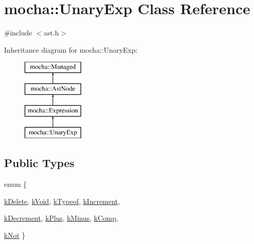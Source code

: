 \hypertarget{classmocha_1_1_unary_exp}{
\section{mocha::UnaryExp Class Reference}
\label{classmocha_1_1_unary_exp}
}


{\ttfamily \#include $<$ast.h$>$}

Inheritance diagram for mocha::UnaryExp:\begin{figure}[H]
\begin{center}
\leavevmode
\includegraphics[height=4.000000cm]{classmocha_1_1_unary_exp}
\end{center}
\end{figure}
\subsection*{Public Types}
\begin{DoxyCompactItemize}
\item 
enum \{ \par
\hyperlink{classmocha_1_1_unary_exp_a621ac6867fcae6e66ea6111eff70cdb0aad8769c251bddb983fcece5ec0cb75f3}{kDelete}, 
\hyperlink{classmocha_1_1_unary_exp_a621ac6867fcae6e66ea6111eff70cdb0a63356cfc69289a4b478e9431802e536a}{kVoid}, 
\hyperlink{classmocha_1_1_unary_exp_a621ac6867fcae6e66ea6111eff70cdb0ac39acc1174b405d0effb5cedcd845364}{kTypeof}, 
\hyperlink{classmocha_1_1_unary_exp_a621ac6867fcae6e66ea6111eff70cdb0af4edf9416048533e31de4e84eefd35f1}{kIncrement}, 
\par
\hyperlink{classmocha_1_1_unary_exp_a621ac6867fcae6e66ea6111eff70cdb0a2cbe8e7f32d47d7d6deea4c8f14e6330}{kDecrement}, 
\hyperlink{classmocha_1_1_unary_exp_a621ac6867fcae6e66ea6111eff70cdb0ace184c36a28e008d10b5471551da2790}{kPlus}, 
\hyperlink{classmocha_1_1_unary_exp_a621ac6867fcae6e66ea6111eff70cdb0a4d6a5e24917c2b1e4f1975d5ba51f7a0}{kMinus}, 
\hyperlink{classmocha_1_1_unary_exp_a621ac6867fcae6e66ea6111eff70cdb0ade84e553b09732430de6b9b0f081a783}{kComp}, 
\par
\hyperlink{classmocha_1_1_unary_exp_a621ac6867fcae6e66ea6111eff70cdb0ac79b5fa736f29f60ebdd44f48231b000}{kNot}
 \}
\end{DoxyCompactItemize}
